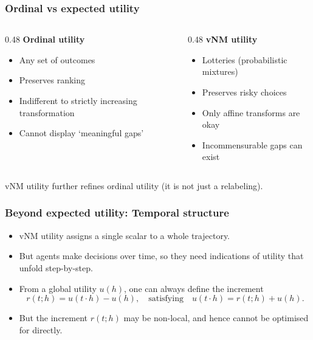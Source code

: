 \documentclass[10pt,a4paper]{beamer}
\begin{document}
\begin{frame}
\frametitle{Ordinal vs expected utility}
\begin{columns}
\begin{column}{0.48\textwidth}
\textbf{Ordinal utility}
\begin{itemize}
    \item Any set of outcomes
    \item Preserves ranking
    \item Indifferent to strictly increasing transformation
    \item Cannot display `meaningful gaps'
\end{itemize}
\end{column}
\begin{column}{0.48\textwidth}
\textbf{vNM utility}
\begin{itemize}
    \item Lotteries (probabilistic mixtures)
    \item Preserves risky choices
    \item Only affine transforms are okay
    \item Incommensurable gaps can exist
\end{itemize}
\end{column}
\end{columns}

\pause
\vspace{0.4cm}
\centering
vNM utility further refines ordinal utility (it is not just a relabeling).
\end{frame}



\begin{frame}
\frametitle{Beyond expected utility: Temporal structure}
\begin{itemize}
    \item vNM utility assigns a single scalar to a whole trajectory.
    \pause
    \item But agents make decisions over time, so they need indications of utility that unfold step-by-step.
    \pause
    \item From a global utility $u(h)$, one can always define the increment
    $$
    r(t;h)=u(t\cdot h)-u(h),\quad\text{satisfying}\quad u(t\cdot h)=r(t;h)+u(h).
    $$
    \begin{center}
    \end{center}
    \pause
    \item But the increment $r(t;h)$ may be non-local, and hence cannot be optimised for directly.
\end{itemize}
\end{frame}
\end{document}
